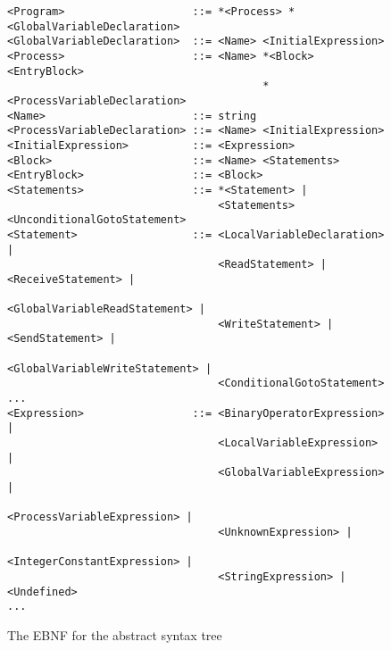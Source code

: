 \begin{figure}[b!]
\footnotesize
\begin{verbatim}
<Program>                    ::= *<Process> *<GlobalVariableDeclaration>
<GlobalVariableDeclaration>  ::= <Name> <InitialExpression>
<Process>                    ::= <Name> *<Block> <EntryBlock> 
                                        *<ProcessVariableDeclaration>
<Name>                       ::= string
<ProcessVariableDeclaration> ::= <Name> <InitialExpression>
<InitialExpression>          ::= <Expression>
<Block>                      ::= <Name> <Statements>
<EntryBlock>                 ::= <Block>
<Statements>                 ::= *<Statement> |
                                 <Statements> <UnconditionalGotoStatement>
<Statement>                  ::= <LocalVariableDeclaration> |
                                 <ReadStatement> | <ReceiveStatement> |
                                 <GlobalVariableReadStatement> |
                                 <WriteStatement> | <SendStatement> |
                                 <GlobalVariableWriteStatement> |
                                 <ConditionalGotoStatement>
...
<Expression>                 ::= <BinaryOperatorExpression> |
                                 <LocalVariableExpression> |
                                 <GlobalVariableExpression> |
                                 <ProcessVariableExpression> |
                                 <UnknownExpression> |
                                 <IntegerConstantExpression> |
                                 <StringExpression> | <Undefined>
...
\end{verbatim}
\normalsize
\caption{The EBNF for the abstract syntax tree}
\label{fig:ASTEBNF}
\end{figure}
